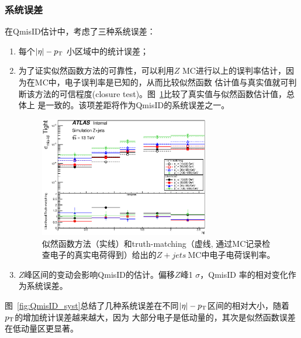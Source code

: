 \subsubsection{系统误差}
在QmisID估计中，考虑了三种系统误差：
\begin{enumerate}
 \item 每个$|\eta|-p_{\text{T}}$ 小区域中的统计误差；
 \item 为了证实似然函数方法的可靠性，可以利用$Z$ MC进行以上的误判率估计，因为在MC中，电子误判率是已知的，从而比较似然函数
估计值与真实值就可判断该方法的可信程度(closure test)。图~\ref{fig:QmisID_TMLik}比较了真实值与似然函数估计值，总体上
是一致的。该项差距将作为QmisID的系统误差之一。
\begin{figure}[h]
\centering
 \includegraphics[width=0.70\textwidth]{fig/QmisID/TMLik_tight.eps}
 \caption{似然函数方法（实线）和truth-matching（虚线, 通过MC记录检查电子的真实电荷得到）给出的$Z+jets~$MC中电子电荷误判率。}
\label{fig:QmisID_TMLik}
\end{figure}

 \item $Z$峰区间的变动会影响QmisID的估计。偏移$Z$峰1 $\sigma$，QmisID 率的相对变化作为系统误差。
\end{enumerate}
图~\ref{fig:QmisID_syst}总结了几种系统误差在不同$|\eta|-p_{\text{T}}$区间的相对大小，随着$p_{\text{T}}$的增加统计误差越来越大，因为
大部分电子是低动量的，其次是似然函数误差在低动量区更显著。
